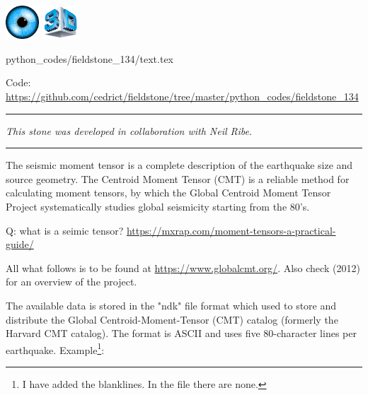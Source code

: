 \includegraphics[height=1.25cm]{images/pictograms/visualisation}
\includegraphics[height=1.25cm]{images/pictograms/3d}


\begin{flushright} {\tiny {\color{gray} python\_codes/fieldstone\_134/text.tex}} \end{flushright}

%

\begin{center}
\inpython 
Code: \url{https://github.com/cedrict/fieldstone/tree/master/python_codes/fieldstone_134}
\end{center}

\par\noindent\rule{\textwidth}{0.4pt}

{\sl This stone was developed in collaboration with Neil Ribe}. 

\par\noindent\rule{\textwidth}{0.4pt}

The seismic moment tensor is a complete description of the earthquake size and source geometry. 
The Centroid Moment Tensor (CMT) is a reliable method for calculating moment tensors, 
by which the Global Centroid Moment Tensor Project systematically studies global seismicity 
starting from the 80's.

Q: what is a seimic tensor? \url{https://mxrap.com/moment-tensors-a-practical-guide/}

All what follows is to be found at \url{https://www.globalcmt.org/}.
Also check \textcite{eknd12} (2012) for an overview of the project.

The available data is stored in the "ndk" file format which used to store
and distribute the Global Centroid-Moment-Tensor (CMT) catalog
(formerly the Harvard CMT catalog).
The format is ASCII and uses five 80-character lines per earthquake. 
Example\footnote{I have added the blanklines. In the file there are none.}:

